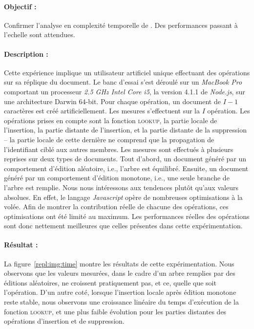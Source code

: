 \paragraph{Objectif :} Confirmer l'analyse en complexité temporelle de
\LSEQ. Des performances passant à l'echelle sont attendues.

\paragraph{Description :} Cette expérience implique un utilisateur artificiel
unique effectuant des opérations sur sa réplique du document. Le banc d'essai
s'est déroulé sur un \emph{MacBook Pro} comportant un processeur \emph{2.5 GHz
  Intel Core i5}, la version 4.1.1 de \emph{Node.js}, sur une architecture
Darwin 64-bit. Pour chaque opération, un document de $I-1$ caractères est créé
artificiellement. Les mesures s'effectuent sur la $I$ opération. Les
opérations prises en compte sont la fonction \textsc{lookup}, la partie locale
de l'insertion, la partie distante de l'insertion, et la partie distante de la
suppression -- la partie locale de cette dernière ne comprend que la propagation
de l'identifiant ciblé aux autres membres. Les mesures sont effectués à
plusieurs reprises sur deux types de documents. Tout d'abord, un document généré
par un comportement d'édition aléatoire, i.e., l'arbre \LSEQ est
équilibré. Ensuite, un document généré par un comportement d'édition monotone,
i.e., une seule branche de l'arbre \LSEQ est remplie. Nous nous intéressons aux
tendences plutôt qu'aux valeurs absolues. En effet, le langage \emph{Javascript}
opère de nombreuses optimisations à la volée. Afin de montrer la contribution
réelle de chacune des opérations, ces optimisations ont été limité au
maximum. Les performances réelles des opérations sont donc nettement meilleures
que celles présentes dans cette expérimentation.

\paragraph{Résultat :} La figure~\ref{repl:img:time} montre les résultats de
cette expérimentation. Nous observons que les valeurs mesurées, dans le cadre
d'un arbre remplies par des éditions aléatoires, ne croissent pratiquement pas,
et ce, quelle que soit l'opération. D'un autre coté, lorsque l'insertion locale
après édition monotone reste stable, nous observons une croissance linéaire du
temps d'exécution de la fonction \textsc{lookup}, et une plus faible évolution
pour les parties distantes des opérations d'insertion et de suppression.

